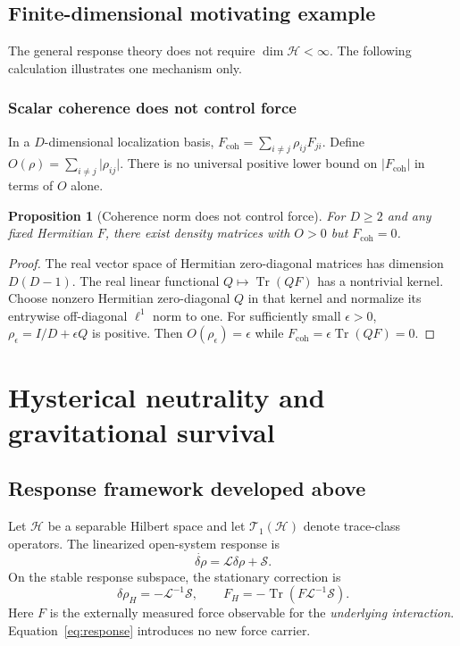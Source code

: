 \documentclass[11pt]{article}
\newtheorem{proposition}[theorem]{Proposition}
\theoremstyle{definition}
\theoremstyle{remark}
\newcommand{\Tr}{\operatorname{Tr}}
\begin{document}
\subsection{Finite-dimensional motivating example}
The general response theory does not require $\dim\mathcal H<\infty$.
The following calculation illustrates one mechanism only.

\subsubsection{Scalar coherence does not control force}
In a $D$-dimensional localization basis,
$F_{\mathrm{coh}}=\sum_{i\neq j}\rho_{ij}F_{ji}$.
Define $O(\rho)=\sum_{i\neq j}\lvert\rho_{ij}\rvert$.
There is no universal positive lower bound on $\lvert F_{\mathrm{coh}}\rvert$ in terms of $O$ alone.

\begin{proposition}[Coherence norm does not control force]\label{prop:coherence-norm}
For $D\ge 2$ and any fixed Hermitian $F$, there exist density matrices with $O>0$ but $F_{\mathrm{coh}}=0$.
\end{proposition}
\begin{proof}
The real vector space of Hermitian zero-diagonal matrices has dimension $D(D-1)$.
The real linear functional $Q\mapsto\Tr(QF)$ has a nontrivial kernel.
Choose nonzero Hermitian zero-diagonal $Q$ in that kernel and normalize its entrywise off-diagonal $\ell^1$ norm to one.
For sufficiently small $\epsilon>0$, $\rho_\epsilon=I/D+\epsilon Q$ is positive.
Then $O(\rho_\epsilon)=\epsilon$ while $F_{\mathrm{coh}}=\epsilon\Tr(QF)=0$.
\end{proof}

\section{Hysterical neutrality and gravitational survival}
\label{sec:neutrality}
\subsection{Response framework developed above}
Let $\mathcal H$ be a separable Hilbert space and let $\mathcal T_1(\mathcal H)$ denote trace-class operators.  The linearized open-system response is
\begin{equation}
 \dot{\delta\rho}=\mathcal L\delta\rho+\mathcal S.
\end{equation}
On the stable response subspace, the stationary correction is
\begin{equation}
 \delta\rho_H=-\mathcal L^{-1}\mathcal S,
 \qquad
 F_H=-\Tr\!\left(F\mathcal L^{-1}\mathcal S\right).
 \label{eq:response}
\end{equation}
Here $F$ is the externally measured force observable for the \emph{underlying interaction}.  Equation~\eqref{eq:response} introduces no new force carrier.
\end{document}
